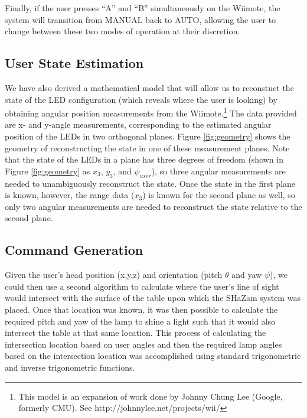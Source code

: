 \documentclass[conference, twocolumn]{IEEEtran}
\begin{document}
Finally, if the user presses ``A'' and ``B'' simultaneously on the Wiimote, the system will transition from MANUAL back to AUTO, allowing the user to change between these two modes of operation at their discretion.

\subsection{User State Estimation}
We have also derived a mathematical model that will allow us to reconstuct the state of the LED configuration (which reveals where the user is looking) by obtaining angular position measurements from the Wiimote.\footnote{This model is an expansion of work done by Johnny Chung Lee (Google, formerly CMU). See http://johnnylee.net/projects/wii/} The data provided are x- and y-angle measurements, corresponding to the estimated angular position of the LEDs in two orthogonal planes. Figure \ref{fig:geometry} shows the geometry of reconstructing the state in one of these measurement planes. Note that the state of the LEDs in a plane has three degrees of freedom (shown in Figure \ref{fig:geometry} as $x_{3}$, $y_{3}$, and $\psi_{user}$), so three angular measurements are needed to unambiguously reconstruct the state. Once the state in the first plane is known, however, the range data ($x_3$) is known for the second plane as well, so only two angular measurements are needed to reconstruct the state relative to the second plane. 

\subsection{Command Generation}
Given the user's head position (x,y,z) and orientation (pitch $\theta$ and yaw $\psi$), we could then use a second algorithm to calculate where the user's line of sight would intersect with the surface of the table upon which the SHaZam system was placed. Once that location was known, it was then possible to calculate the required pitch and yaw of the lamp to shine a light such that it would also intersect the table at that same location. This process of calculating the intersection location based on user angles and then the required lamp angles based on the intersection location was accomplished using standard trigonometric and inverse trigonometric functions.
\end{document}
